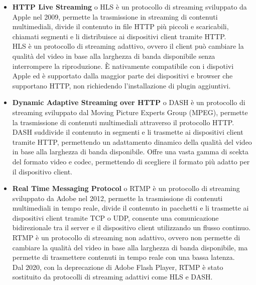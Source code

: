 \begin{itemize}

    \item \textbf{HTTP Live Streaming} o HLS è un protocollo di streaming sviluppato da Apple nel 2009, permette la trasmissione in streaming di contenuti multimediali,
    divide il contenuto in file HTTP più piccoli e scaricabili, chiamati segmenti e li distribuisce ai dispositivi client tramite HTTP.\\
    HLS è un protocollo di streaming adattivo, ovvero il client può cambiare la qualità del video in base alla larghezza di banda disponibile senza interrompere la riproduzione.
    È nativamente compatibile con i dispotivi Apple ed è supportato dalla maggior parte dei dispositivi e browser che supportano HTTP, non richiedendo l'installazione di plugin aggiuntivi.\\

    \item \textbf{Dynamic Adaptive Streaming over HTTP} o DASH è un protocollo di streaming sviluppato dal Moving Picture Experts Group (MPEG), permette la trasmissione di contenuti multimediali
    attraverso il protocollo HTTP.\\
    DASH suddivide il contenuto in segmenti e li trasmette ai dispositivi client tramite HTTP, permettendo un adattamento dinamico della qualità del video in base alla larghezza di banda disponibile.
    Offre una vasta gamma di scekta del formato video e codec, permettendo di scegliere il formato più adatto per il dispositivo client.\\

    \item \textbf{Real Time Messaging Protocol} o RTMP è un protocollo di streaming sviluppato da Adobe nel 2012, permette la trasmissione di contenuti multimediali in tempo reale,
    divide il contenuto in pacchetti e li trasmette ai dispositivi client tramite TCP o UDP, consente una comunicazione bidirezionale tra il server e il dispositivo client utilizzando un flusso continuo.\\
    RTMP è un protocollo di streaming non adattivo, ovvero non permette di cambiare la qualità del video in base alla larghezza di banda disponibile, ma permette di 
    trasmettere contenuti in tempo reale con una bassa latenza.\\
    Dal 2020, con la deprecazione di Adobe Flash Player, RTMP è stato sostituito da protocolli di streaming adattivi come HLS e DASH.\\
    \end{itemize}

